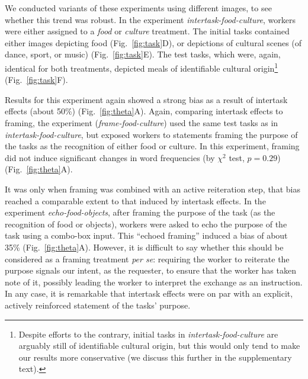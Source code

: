 \documentclass[12pt]{article}
\begin{document}
We conducted variants of these experiments using different images, to see 
whether this trend was robust.  In the experiment 
\textit{intertask-food-culture},
workers were either assigned to a \textit{food} or \textit{culture} treatment.
The initial tasks contained either images 
depicting food (Fig.~\ref{fig:task}D), or depictions of cultural scenes 
(of dance, sport, or music) (Fig.~\ref{fig:task}E).  The test tasks, which 
were, again, identical for both treatments, depicted meals of identifiable 
cultural origin\footnote{
	Despite efforts to the contrary, initial tasks 
	in \textit{intertask-food-culture} are arguably still of
	identifiable cultural origin, but this would only tend to make our 
	results more conservative (we discuss this further in the supplementary 
	text).
}
(Fig.~\ref{fig:task}F).  

Results for this experiment again showed a 
strong bias as a result of intertask effects (about 50\%) 
(Fig.~\ref{fig:theta}A).  Again, comparing intertask effects to 
framing, the experiment (\textit{frame-food-culture}) used
the same test tasks as in \textit{intertask-food-culture}, but exposed
workers to statements framing the purpose of the tasks as the recognition 
of either food or culture.  In this experiment, framing did not induce 
significant changes in word frequencies (by $\chi^2$ test, $p=0.29$) (Fig.~\ref{fig:theta}A).

It was only when framing was combined with an active reiteration step, 
that bias reached a comparable extent to that induced by intertask effects.  
In the experiment \textit{echo-food-objects},
after framing the purpose of the task (as the recognition of food
or objects), workers were asked to echo the purpose of the task
using a combo-box input.  This  ``echoed framing'' induced a bias of about 
35\% (Fig.~\ref{fig:theta}A). However, it is difficult to say whether this 
should be considered as a framing treatment \textit{per se}:
requiring the worker to reiterate the purpose signals our intent, as the 
requester, to ensure that the worker has taken note of it, possibly leading 
the worker to interpret the exchange as an instruction.  
In any case, it is remarkable that intertask effects
were on par with an explicit, actively reinforced statement of the tasks' 
purpose.
\end{document}
